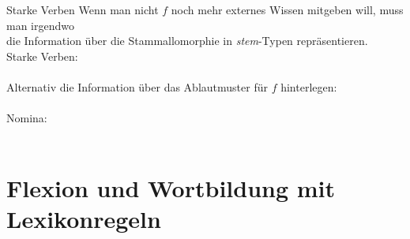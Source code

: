 \begin{frame}
  {Starke Verben}
  \onslide<+->
  \onslide<+->
  Wenn man nicht $f$ noch mehr externes Wissen mitgeben will, muss man irgendwo\\
  die \alert{Information über die Stammallomorphie} in \textit{stem}-Typen repräsentieren.\\
  \onslide<+->
  \Halbzeile
  \small Starke Verben:\\
  \\
  \onslide<+->
  \Zeile
  \small Alternativ die Information über das Ablautmuster für $f$ hinterlegen:\\
  \\
  \onslide<+->
  \Zeile
  \small Nomina:\\
  \hspace{1em}%
  \\
  \raggedleft
\end{frame}

\section{Flexion und Wortbildung mit Lexikonregeln}


